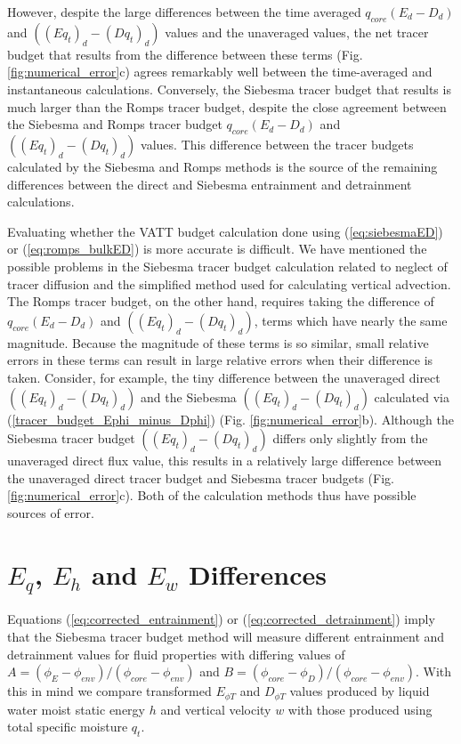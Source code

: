 \documentclass[12pt]{article}
\begin{document}
However, despite the large differences between the time averaged 
$q_{core}(E_d - D_d)$ and $((Eq_t)_d - (Dq_t)_d)$ values and the unaveraged
values, the net tracer budget that results from the difference
between these terms (Fig. \ref{fig:numerical_error}c) agrees remarkably 
well between the time-averaged and instantaneous calculations.  Conversely, the 
Siebesma tracer budget that results is much larger 
than the Romps tracer budget, despite the close agreement between the 
Siebesma and Romps tracer budget $q_{core}(E_d - D_d)$ and 
$((Eq_t)_d - (Dq_t)_d)$ values.  This difference between the tracer budgets
calculated by the Siebesma and Romps methods is the source of the remaining
differences between the direct and Siebesma entrainment and detrainment
calculations.

Evaluating whether the VATT budget calculation done using (\ref{eq:siebesmaED})
or (\ref{eq:romps_bulkED}) is more accurate is difficult.
We have mentioned the possible problems in the Siebesma tracer budget
calculation related to neglect of tracer diffusion and the simplified method 
used for calculating vertical advection.  The Romps tracer budget, on the other 
hand, requires taking the difference of $q_{core}(E_d - D_d)$ and 
$((Eq_t)_d - (Dq_t)_d)$, terms which have nearly the same magnitude.  
Because the magnitude of these terms is so similar, small relative errors in
these terms can result in large relative errors when their difference is taken.
Consider, for example, the tiny difference between the unaveraged direct 
$((Eq_t)_d - (Dq_t)_d)$ and the Siebesma $((Eq_t)_d - (Dq_t)_d)$ calculated
via (\ref{tracer_budget_Ephi_minus_Dphi}) (Fig. \ref{fig:numerical_error}b).
Although the Siebesma tracer budget $((Eq_t)_d - (Dq_t)_d)$ differs only
slightly from the unaveraged direct flux value, this results in a relatively
large difference between the unaveraged direct tracer budget and Siebesma 
tracer budgets (Fig. \ref{fig:numerical_error}c).  Both of the calculation 
methods thus have possible sources of error.


\section{$E_q$, $E_h$ and $E_w$ Differences}

Equations (\ref{eq:corrected_entrainment}) or (\ref{eq:corrected_detrainment}) 
imply that the Siebesma tracer budget method will measure different entrainment
and detrainment values for fluid properties with differing values of 
$A = (\phi_E - \phi_{env})/(\phi_{core} - \phi_{env})$ and
$B = (\phi_{core} - \phi_D)/(\phi_{core} - \phi_{env})$.  With this in mind we 
compare transformed $E_{\phi T}$ and $D_{\phi T}$ values produced by liquid 
water moist static energy $h$ and vertical velocity $w$ with those produced 
using total specific moisture $q_t$.
\end{document}
